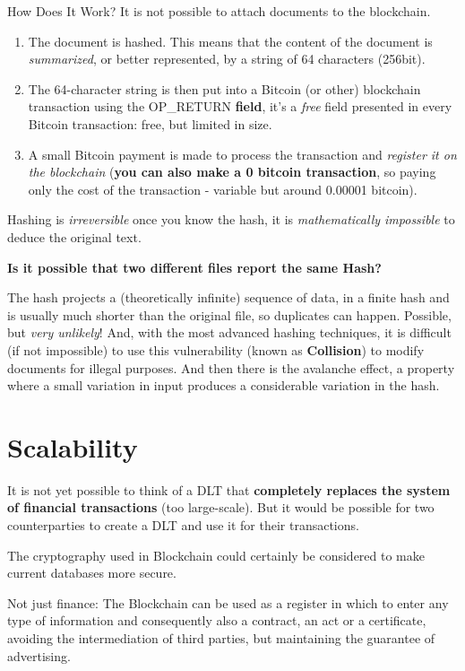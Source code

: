 How Does It Work? It is not possible to attach documents to the blockchain.
\begin{enumerate}
	\item The document is hashed. This means that the content of the document is \textit{summarized}, or better represented, by a string of 64 characters (256bit).
	\item The 64-character string is then put into a Bitcoin (or other) blockchain transaction using the {\selectfont OP\_RETURN} \textbf{field}, it's a \textit{free} field presented in every Bitcoin transaction: free, but limited in size.
	\item A small Bitcoin payment is made to process the transaction and \textit{register it on the blockchain} (\textbf{you can also make a 0 bitcoin transaction}, so paying only the cost of the transaction - variable but around 0.00001 bitcoin).
\end{enumerate}

Hashing is \textit{irreversible} once you know the hash, it is \textit{mathematically impossible} to deduce the original text.

\textbf{Is it possible that two different files report the same Hash?}

The hash projects a (theoretically infinite) sequence of data, in a finite hash and is usually much shorter than the original file, so duplicates can happen. Possible, but \textit{very unlikely}! And, with the most advanced hashing techniques, it is difficult (if not impossible) to use this vulnerability (known as \textbf{Collision}) to modify documents for illegal purposes. And then there is the avalanche effect, a property where a small variation in input produces a considerable variation in the hash.

\section{Scalability}

It is not yet possible to think of a DLT that \textbf{completely replaces the system of financial transactions} (too large-scale). But it would be possible for two counterparties to create a DLT and use it for their transactions.

The cryptography used in Blockchain could certainly be considered to make current databases more secure.

Not just finance: The Blockchain can be used as a register in which to enter any type of information and consequently also a contract, an act or a certificate, avoiding the intermediation of third parties, but maintaining the guarantee of advertising.

